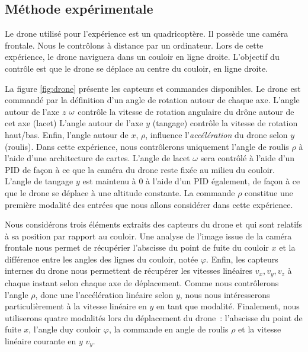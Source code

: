 \documentclass[../main]{subfiles}
\begin{document}
\subsection{Méthode expérimentale}

Le drone utilisé pour l'expérience est un quadricoptère. Il possède une caméra frontale.
Nous le contrôlons à distance par un ordinateur.  Lors de cette expérience, le drone naviguera dans un couloir en ligne droite. L'objectif du contrôle est que le drone se déplace au centre du couloir, en ligne droite.


La figure \ref{fig:drone} présente les capteurs et commandes disponibles.
Le drone est commandé par la définition d'un angle de rotation autour de chaque axe. 
L'angle autour de l'axe $z$ $\omega$ contrôle la vitesse de rotation angulaire du drône autour de cet axe (lacet)
L'angle autour de l'axe $y$ (tangage) contrôle la vitesse de rotation haut/bas. Enfin, l'angle autour de $x$, $\rho$, influence l'\emph{accélération} du drone selon $y$ (roulis). Dans cette expérience, nous contrôlerons uniquement l'angle de roulis $\rho$ à l'aide d'une architecture de cartes.
L'angle de lacet $\omega$ sera contrôlé à l'aide d'un PID de façon à ce que la caméra du drone reste fixée au milieu du couloir. L'angle de tangage $y$ est maintenu à 0 à l'aide d'un PID également, de façon à ce que le drone se déplace à une altitude constante.
La commande $\rho$ constitue une première modalité des entrées que nous allons considérer dans cette expérience.

Nous considérons trois éléments extraits des capteurs du drone et qui sont relatifs à sa position par rapport au couloir. Une analyse de l'image issue de la caméra frontale nous permet de récupérier l'abscisse du point de fuite du couloir $x$ et la différence entre les angles des lignes du couloir, notée $\varphi$.
Enfin, les capteurs internes du drone nous permettent de récupérer les vitesses linéaires $v_x,v_y,v_z$ à chaque instant selon chaque axe de déplacement. 
Comme nous contrôlerons l'angle $\rho$, donc une l'accélération linéaire selon $y$, nous nous intéresserons particulièrement à la vitesse linéaire en $y$ en tant que modalité.
Finalement, nous utiliserons quatre modalités lors du déplacement du drone~: l'abscisse du point de fuite $x$, l'angle duy couloir $\varphi$, la commande en angle de roulis $\rho$ et la vitesse linéaire courante en $y$ $v_y$.
\end{document}
